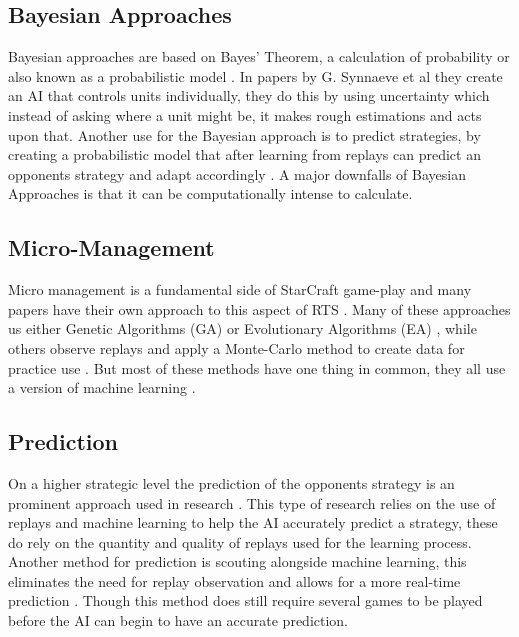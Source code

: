 \documentclass[journal]{IEEEtran}
\begin{document}
 
\subsection{Bayesian Approaches}
Bayesian approaches are based on Bayes' Theorem, a calculation of probability or also known as a probabilistic model \cite{BayesianAI}. In papers by G. Synnaeve et al \cite{UnitsControl}\cite{SpecialTactics} they create an AI that controls units individually, they do this by using uncertainty which instead of asking where a unit might be, it makes rough estimations and acts upon that. Another use for the Bayesian approach is to predict strategies, by creating a probabilistic model that after learning from replays can predict an opponents strategy and adapt accordingly \cite{Bayesian}. A major downfalls of Bayesian Approaches is that it can be computationally intense to calculate.

\subsection{Micro-Management}
Micro management is a fundamental side of StarCraft game-play and many papers have their own approach to this aspect of RTS \cite{SOMA}\cite{EffectiveMicro}\cite{Swarm}\cite{MM}\cite{SpecialTactics}\cite{UnitsControl}. Many of these approaches us either Genetic Algorithms (GA) or Evolutionary Algorithms (EA) \cite{SOMA}\cite{EffectiveMicro}\cite{Swarm}, while others observe replays and apply a Monte-Carlo method to create data for practice use \cite{MM}. But most of these methods have one thing in common, they all use a version of machine learning \cite{Survey}.

\subsection{Prediction}
On a higher strategic level the prediction of the opponents strategy is an prominent approach used in research \cite{DataMine}\cite{Bayesian}\cite{Scouting}\cite{ReplayPred}. This type of research relies on the use of replays and machine learning to help the AI accurately predict a strategy, these do rely on the quantity and quality of replays used for the learning process\cite{DataMine}\cite{Bayesian}\cite{ReplayPred}. Another method for prediction is scouting alongside machine learning, this eliminates the need for replay observation and allows for a more real-time prediction \cite{Scouting}. Though this method does still require several games to be played before the AI can begin to have an accurate prediction.
\end{document}
